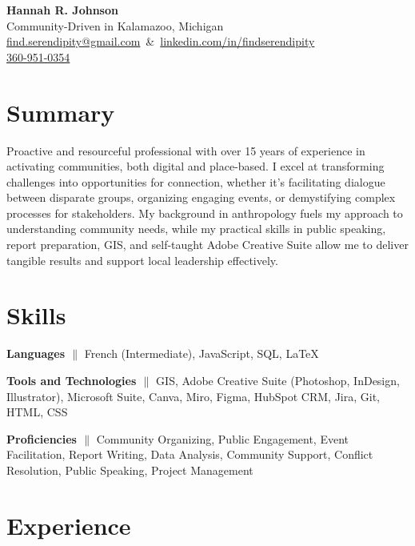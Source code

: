 \documentclass[a4paper,12pt]{article} %
\begin{document}
      \begin{center} %
      {\LARGE \textbf{Hannah R. Johnson}} \\
      Community-Driven in Kalamazoo, Michigan \\
      \mbox{\href{mailto:find.serendipity@gmail.com}{find.serendipity@gmail.com} \&
            \href{https://www.linkedin.com/in/findserendipity/}{linkedin.com/in/findserendipity}}\\
      \href{tel:360-951-0354}{360-951-0354}

\end{center}

\section{Summary }
\noindent
Proactive and resourceful professional with over 15 years of experience in activating communities, both digital and place-based. I excel at transforming challenges into opportunities for connection, whether it's facilitating dialogue between disparate groups, organizing engaging events, or demystifying complex processes for stakeholders. My background in anthropology fuels my approach to understanding community needs, while my practical skills in public speaking, report preparation, GIS, and self-taught Adobe Creative Suite allow me to deliver tangible results and support local leadership effectively.

\section{Skills}
\textbf{Languages {$\parallel$}} \small{{ French (Intermediate), JavaScript, SQL, LaTeX }} %

\textbf{Tools and Technologies {$\parallel$}} \small{{ GIS, Adobe Creative Suite (Photoshop, InDesign, Illustrator), Microsoft Suite, Canva, Miro, Figma, HubSpot CRM, Jira, Git, HTML, CSS }} %

\textbf{Proficiencies {$\parallel$}} \small{{ Community Organizing, Public Engagement, Event Facilitation, Report Writing, Data Analysis, Community Support, Conflict Resolution, Public Speaking, Project Management }} %
\section{Experience}
\end{document}
